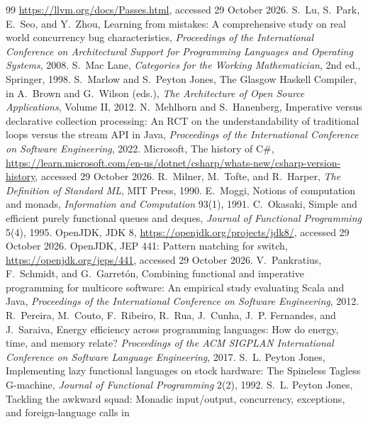 \documentclass[11pt]{article}
\theoremstyle{definition}
\theoremstyle{remark}
\begin{document}
\begin{thebibliography}{99}
  \url{https://llvm.org/docs/Passes.html}, accessed 29 October 2026.
   S.~Lu, S.~Park, E.~Seo, and Y.~Zhou, Learning from mistakes:
  A comprehensive study on real world concurrency bug characteristics,
  \emph{Proceedings of the International Conference on Architectural
  Support for Programming Languages and Operating Systems}, 2008.
   S.~Mac Lane, \emph{Categories for the Working
  Mathematician}, 2nd ed., Springer, 1998.
   S.~Marlow and S.~Peyton Jones, The Glasgow Haskell
  Compiler, in A.~Brown and G.~Wilson (eds.), \emph{The Architecture of
  Open Source Applications}, Volume II, 2012.
   N.~Mehlhorn and S.~Hanenberg, Imperative versus
  declarative collection processing: An RCT on the understandability of
  traditional loops versus the stream API in Java, \emph{Proceedings of the
  International Conference on Software Engineering}, 2022.
   Microsoft, The history of C\#,
  \url{https://learn.microsoft.com/en-us/dotnet/csharp/whats-new/csharp-version-history},
  accessed 29 October 2026.
   R.~Milner, M.~Tofte, and R.~Harper, \emph{The Definition
  of Standard ML}, MIT Press, 1990.
   E.~Moggi, Notions of computation and monads,
  \emph{Information and Computation} 93(1), 1991.
   C.~Okasaki, Simple and efficient purely functional
  queues and deques, \emph{Journal of Functional Programming} 5(4), 1995.
   OpenJDK, JDK 8, \url{https://openjdk.org/projects/jdk8/},
  accessed 29 October 2026.
   OpenJDK, JEP 441: Pattern matching for switch,
  \url{https://openjdk.org/jeps/441}, accessed 29 October 2026.
   V.~Pankratius, F.~Schmidt, and G.~Garret\'on,
  Combining functional and imperative programming for multicore software:
  An empirical study evaluating Scala and Java, \emph{Proceedings of the
  International Conference on Software Engineering}, 2012.
   R.~Pereira, M.~Couto, F.~Ribeiro, R.~Rua, J.~Cunha,
  J.~P. Fernandes, and J.~Saraiva, Energy efficiency across programming
  languages: How do energy, time, and memory relate? \emph{Proceedings of
    the ACM SIGPLAN International Conference on Software Language
  Engineering}, 2017.
   S.~L. Peyton Jones, Implementing lazy functional languages
  on stock hardware: The Spineless Tagless G-machine, \emph{Journal of
  Functional Programming} 2(2), 1992.
   S.~L. Peyton Jones, Tackling the awkward squad: Monadic
  input/output, concurrency, exceptions, and foreign-language calls in

\end{thebibliography}
\end{document}
